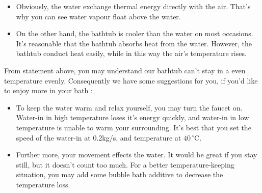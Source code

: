 \documentclass[12pt,a4paper,titlepage]{article}
\begin{document}
\begin{itemize}
\item Obviously, the water exchange thermal energy directly with the air. That's why you can see water vapour float above the water.
\item On the other hand, the bathtub is cooler than the water on most occasions. It's reasonable that the bathtub absorbs heat from the water. However, the bathtub conduct heat easily, while in this way the air's temperature rises.
\end{itemize}
From statement above, you may understand our bathtub can't stay in a even temperature evenly. Consequently we have some suggestions for you, if you'd like to enjoy more in your bath :
\begin{itemize}
\item To keep the water warm and relax yourself, you may turn the faucet on. Water-in in high temperature loses it's energy quickly, and water-in in low temperature is unable to warm your surrounding. It's best that you set the speed of the water-in at 0.2kg/s, and temperature at $40\,^{\circ}\mathrm{C}$.
\item Further more, your movement effects the water. It would be great if you stay still, but it doesn't count too much. For a better temperature-keeping situation, you may add some bubble bath additive to decrease the temperature loss.
\end{itemize}
\end{document}
